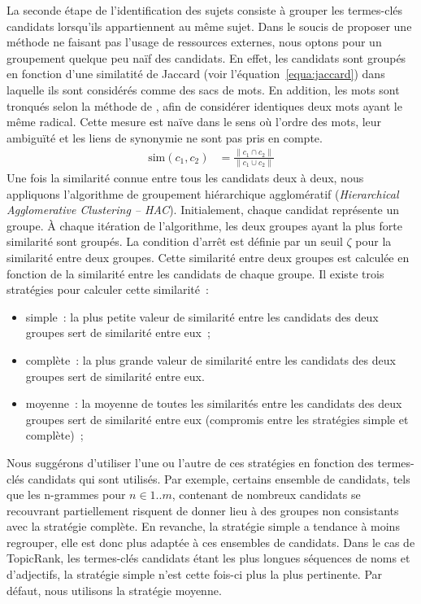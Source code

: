     La seconde étape de l'identification des sujets consiste à grouper les
    termes-clés candidats lorsqu'ils appartiennent au même sujet.
    Dans le soucis de proposer une méthode ne faisant pas l'usage de ressources
    externes, nous optons pour un groupement quelque peu naïf des candidats. En
    effet, les candidats sont groupés en fonction d'une similatité de Jaccard
    (voir l'équation~\ref{equa:jaccard}) dans laquelle ils sont considérés comme
    des sacs de mots. En addition, les mots sont tronqués selon la méthode de
    , afin de considérer identiques deux mots
    ayant le même radical. Cette mesure est naïve dans le sens où l'ordre des
    mots, leur ambiguïté et les liens de synonymie ne sont pas pris en compte.
    \begin{align}
      \text{sim}(c_1, c_2) &= \frac{\|c_1 \cap c_2\|}{\|c_1 \cup c_2\|} \label{equa:jaccard}
    \end{align}
    Une fois la similarité connue entre tous les candidats deux à deux, nous
    appliquons l'algorithme de groupement hiérarchique agglomératif
    (\textit{Hierarchical Agglomerative Clustering -- HAC}). Initialement,
    chaque candidat représente un groupe. À chaque itération de l'algorithme,
    les deux groupes ayant la plus forte similarité sont groupés. La condition
    d'arrêt est définie par un seuil $\zeta$ pour la similarité entre deux
    groupes. Cette similarité entre deux groupes est calculée en fonction de la
    similarité entre les candidats de chaque groupe. Il existe trois stratégies
    pour calculer cette similarité~:
    \begin{itemize}
      \item{simple~: la plus petite valeur de similarité entre les candidats
            des deux groupes sert de similarité entre eux~;}
      \item{complète~: la plus grande valeur de similarité entre les candidats
            des deux groupes sert de similarité entre eux.}
      \item{moyenne~: la moyenne de toutes les similarités entre les
            candidats des deux groupes sert de similarité entre eux (compromis
            entre les stratégies simple et complète)~;}
    \end{itemize}
    Nous suggérons d'utiliser l'une ou l'autre de ces stratégies en fonction des
    termes-clés candidats qui sont utilisés. Par exemple, certains ensemble de
    candidats, tels que les n-grammes pour $n \in 1..m$,
    contenant de nombreux candidats se recouvrant partiellement risquent de
    donner lieu à des groupes non consistants avec la stratégie complète. En
    revanche, la stratégie simple a tendance à moins regrouper, elle est donc
    plus adaptée à ces ensembles de candidats. Dans le cas de TopicRank, les
    termes-clés candidats étant les plus longues séquences de noms et
    d'adjectifs, la stratégie simple n'est cette fois-ci plus la plus
    pertinente. Par défaut, nous utilisons la stratégie moyenne.

